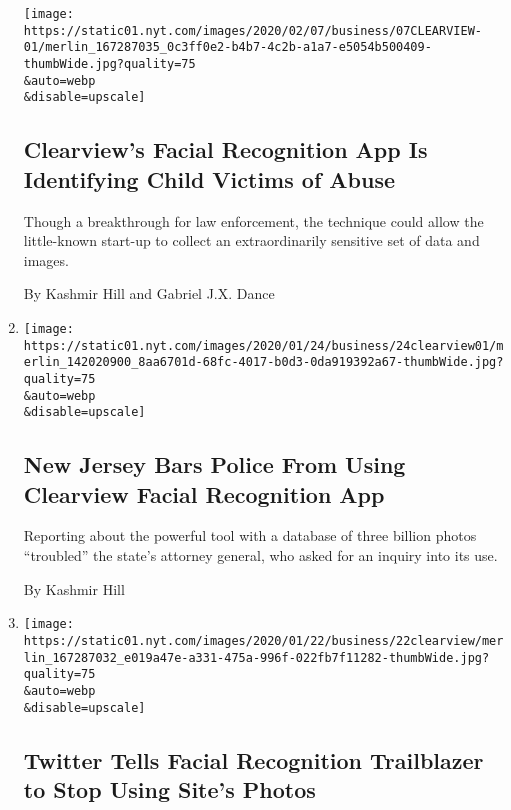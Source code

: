 \begin{enumerate}
  \texttt{[image: https://static01.nyt.com/images/2020/02/07/business/07CLEARVIEW-01/merlin\_167287035\_0c3ff0e2-b4b7-4c2b-a1a7-e5054b500409-thumbWide.jpg?quality=75\\\&auto=webp\\\&disable=upscale]}

  \hypertarget{clearviews-facial-recognition-app-is-identifying-child-victims-of-abuse}{%
  \subsection{Clearview's Facial Recognition App Is Identifying Child
  Victims of
  Abuse}\label{clearviews-facial-recognition-app-is-identifying-child-victims-of-abuse}}

  Though a breakthrough for law enforcement, the technique could allow
  the little-known start-up to collect an extraordinarily sensitive set
  of data and images.

  By Kashmir Hill and Gabriel J.X. Dance
\item
  \href{/2020/01/24/technology/clearview-ai-new-jersey.html}{}

  \texttt{[image: https://static01.nyt.com/images/2020/01/24/business/24clearview01/merlin\_142020900\_8aa6701d-68fc-4017-b0d3-0da919392a67-thumbWide.jpg?quality=75\\\&auto=webp\\\&disable=upscale]}

  \hypertarget{new-jersey-bars-police-from-using-clearview-facial-recognition-app}{%
  \subsection{New Jersey Bars Police From Using Clearview Facial
  Recognition
  App}\label{new-jersey-bars-police-from-using-clearview-facial-recognition-app}}

  Reporting about the powerful tool with a database of three billion
  photos ``troubled'' the state's attorney general, who asked for an
  inquiry into its use.

  By Kashmir Hill
\item
  \href{/2020/01/22/technology/clearview-ai-twitter-letter.html}{}

  \texttt{[image: https://static01.nyt.com/images/2020/01/22/business/22clearview/merlin\_167287032\_e019a47e-a331-475a-996f-022fb7f11282-thumbWide.jpg?quality=75\\\&auto=webp\\\&disable=upscale]}

  \hypertarget{twitter-tells-facial-recognition-trailblazer-to-stop-using-sites-photos}{%
  \subsection{Twitter Tells Facial Recognition Trailblazer to Stop Using
  Site's
  Photos}\label{twitter-tells-facial-recognition-trailblazer-to-stop-using-sites-photos}}


\end{enumerate}

